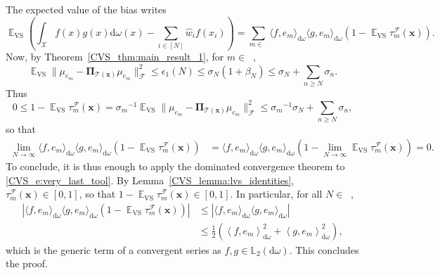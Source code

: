 \documentclass[twoside,11pt]{book}
\numberwithin{theorem}{chapter}
\numberwithin{definition}{chapter}
\numberwithin{proposition}{chapter}
\numberwithin{corollary}{chapter}
\numberwithin{example}{chapter}
\numberwithin{lemma}{chapter}
\numberwithin{assumption}{chapter}
\numberwithin{equation}{chapter}
\numberwithin{figure}{chapter}
\DeclareMathOperator{\VS}{\mathrm{VS}}
\DeclareMathOperator{\EX}{\mathbb{E}}
\DeclareMathOperator{\F}{\mathcal{F}}
\DeclareMathOperator{\X}{\mathcal{X}}
\def\Ltwo{\mathbb{L}_{2}(\mathrm{d} \omega)}
\DeclareMathOperator{\Ns}{\mathbb{N}^{*}}
\begin{document}
The expected value of the bias writes
\begin{equation}
\EX_{\VS} \left( \int_{\X} f(x)g(x) \mathrm{d}\omega(x) - \sum\limits_{i \in [N]} \widehat{w}_{i}f(x_{i}) \right)= \sum\limits_{m \in \Ns} \langle f,e_{m} \rangle_{\mathrm{d}\omega}\langle g,e_{m} \rangle_{\mathrm{d}\omega} \left( 1- \EX_{\VS}\tau_{m}^{\F}(\bm{x}) \right).
\label{CVS_e:very_last_tool}
\end{equation}
Now, by Theorem~\ref{CVS_thm:main_result_1}, for $m \in \Ns$,
\begin{equation}
\EX_{\VS} \|\mu_{e_{m}} - \bm{\Pi}_{\mathcal{T}(\bm{x})} \mu_{e_{m}}\|_{\F}^{2} \leq \epsilon_{1}(N) \leq \sigma_{N}(1+\beta_{N}) \leq \sigma_{N} + \sum\limits_{n \geq N} \sigma_{n}.
\end{equation}
Thus
\begin{equation}
0 \leq 1-\EX_{\VS} \tau_{m}^{\F}(\bm{x}) = {\sigma_m}^{-1} \EX_{\VS} \|\mu_{e_{m}} - \bm{\Pi}_{\mathcal{T}(\bm{x})} \mu_{e_{m}}\|_{\F}^{2} \leq {\sigma_{m}}^{-1}{\sigma_{N} + \sum\limits_{n \geq N} \sigma_{n}},
\end{equation}
so that
\begin{align}
\lim_{N \rightarrow \infty} \langle f,e_{m} \rangle_{\mathrm{d}\omega}\langle g,e_{m} \rangle_{\mathrm{d}\omega} \left(1- \EX_{\VS}\tau_{m}^{\F}(\bm{x}) \right) & = \langle f,e_{m} \rangle_{\mathrm{d}\omega}\langle g,e_{m} \rangle_{\mathrm{d}\omega} (1-\lim_{N \rightarrow \infty} \EX_{\VS}\tau_{m}^{\F}(\bm{x})) = 0.
\end{align}
To conclude, it is thus enough to apply the dominated convergence theorem to \eqref{CVS_e:very_last_tool}. By Lemma~\ref{CVS_lemma:lvs_identities}, $\tau_{m}^{\F}(\bm{x}) \in [0,1]$, so that $1-\EX_{\VS}\tau_{m}^{\F}(\bm{x}) \in [0,1]$.
In particular, for all $N \in \Ns$,
\begin{align}
|\langle f,e_{m} \rangle_{\mathrm{d}\omega}\langle g,e_{m} \rangle_{\mathrm{d}\omega} \left(1- \EX_{\VS}\tau_{m}^{\F}(\bm{x}) \right)| & \leq |\langle f,e_{m} \rangle_{\mathrm{d}\omega}\langle g,e_{m} \rangle_{\mathrm{d}\omega}|\\
& \leq \frac{1}{2}\left(\left\langle f,e_{m} \right\rangle_{\mathrm{d}\omega}^{2} + \left\langle g,e_{m} \right\rangle_{\mathrm{d}\omega}^{2}\right),
\end{align}
which is the generic term of a convergent series as $f,g\in\Ltwo$. This concludes the proof.
\end{document}
